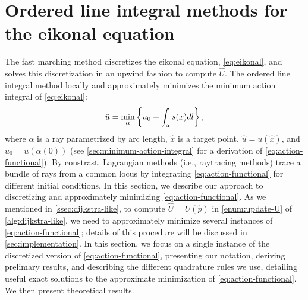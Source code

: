 \documentclass[sisc-eikonal.tex]{subfiles}
\begin{document}
\section{Ordered line integral methods for the eikonal equation}

The fast marching method discretizes the eikonal equation,
\cref{eq:eikonal}, and solves this discretization in an upwind fashion
to compute $\hat{U}$. The ordered line integral method locally and
approximately minimizes the minimum action integral of
\cref{eq:eikonal}:
\begin{equation}
  \label{eq:action-functional}
  \hat{u} = \min_{\alpha} \set{u_0 + \int_\alpha s(x) dl},
\end{equation}
where $\alpha$ is a ray parametrized by arc length, $\hat{x}$ is a
target point, $\hat{u} = u(\hat{x})$, and $u_0 = u(\alpha(0))$ (see
\cref{sec:minimum-action-integral} for a derivation of
\cref{eq:action-functional}). By constrast, Lagrangian methods (i.e.,
raytracing methods) trace a bundle of rays from a common locus by
integrating \cref{eq:action-functional} for different initial
conditions. In this section, we describe our approach to discretizing
and approximately minimizing \cref{eq:action-functional}. As we
mentioned in \cref{ssec:dijkstra-like}, to compute
$\hat{U} = U(\hat{p})$ in \cref{enum:update-U} of
\cref{alg:dijkstra-like}, we need to approximately minimize several
instances of \cref{eq:action-functional}; details of this procedure
will be discussed in \cref{sec:implementation}. In this section, we
focus on a single instance of the discretized version of
\cref{eq:action-functional}, presenting our notation, deriving
prelimary results, and describing the different quadrature rules we
use, detailing useful exact solutions to the approximate minimization
of \cref{eq:action-functional}. We then present theoretical results.
\end{document}
